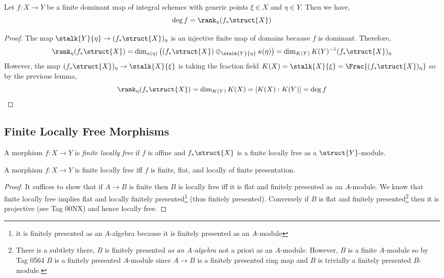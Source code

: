 \documentclass[12pt]{article}
\begin{document}
\begin{prop}
Let $f : X \to Y$ be a finite dominant map of integral schemes with generic points $\xi \in X$ and $\eta \in Y$. Then we have,
\[ \deg{f} = \rank_{\eta}(f_* \struct{X}) \] 
\end{prop}

\begin{proof}
The map $\stalk{Y}{\eta} \to (f_* \struct{X})_\eta$ is an injective finite map of domains because $f$ is dominant. Therefore, 
\[ \rank_\eta(f_* \struct{X}) = \dim_{\kappa(\eta)} \left( (f_* \struct{X}) \otimes_{\stalk{Y}{\eta}} \kappa(\eta) \right) = \dim_{K(Y)} K(Y)^{-1} (f_* \struct{X})_\eta \]
However, the map $(f_* \struct{X})_\eta \to \stalk{X}{\xi}$ is taking the fraction field $K(X) = \stalk{X}{\xi} = \Frac{(f_* \struct{X})_\eta}$ so by the previous lemma,
\[ \rank_{\eta}(f_* \struct{X}) = \dim_{K(Y)} K(X) = [ K(X) : K(Y)] = \deg{f} \]
\end{proof}

\subsection{Finite Locally Free Morphisms}

\begin{defn}
A morphism $f : X \to Y$ is \textit{finite locally free} if $f$ is affine and $f_* \struct{X}$ is a finite locally free as a $\struct{Y}$-module.
\end{defn}

\begin{prop}
A morphism $f : X \to Y$ is finite locally free iff $f$ is finite, flat, and locally of finite presentation.
\end{prop}

\begin{proof}
It suffices to show that if $A \to B$ is finite then $B$ is locally free iff it is flat and finitely presented as an $A$-module. We know that finite locally free implies flat and locally finitely presented\footnote{it is finitely presented as an $A$-algebra because it is finitely presented as an $A$-module } (thus finitely presented). Conversely if $B$ is flat and finitely presented\footnote{There is a subtlety there, $B$ is finitely presented \textit{as an $A$-algebra} not a priori as an $A$-module. However, $B$ is a finite $A$-module so by Tag 0564 $B$ is a finitely presented $A$-module since $A \to B$ is a finitely presented ring map and $B$ is trivially a finitely presented $B$-module.} then it is projective (see Tag 00NX) and hence locally free. 
\end{proof}
\end{document}
